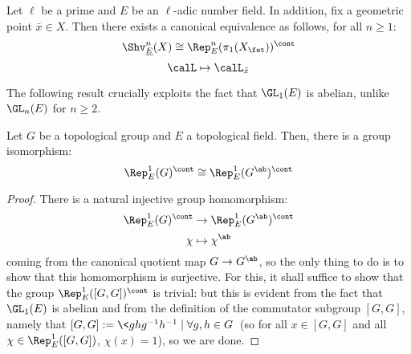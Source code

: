         \begin{corollary} \label{coro: representations_of_the_etale_fundamental_group}
            Let $\ell$ be a prime and $E$ be an $\ell$-adic number field. In addition, fix a geometric point $\bar{x} \in X$. Then there exists a canonical equivalence as follows, for all $n \geq 1$:
                $$\Shv^n_{\underline{E}}(X) \cong \Rep_E^n(\pi_1(X_{\fet}))^{\cont}$$
                $$\calL \mapsto \calL_{\bar{x}}$$
        \end{corollary}
            
        The following result crucially exploits the fact that $\GL_1(E)$ is abelian, unlike $\GL_n(E)$ for $n \geq 2$.
        \begin{lemma} \label{lemma: abelianising_continuous_characters}
            Let $G$ be a topological group and $E$ a topological field. Then, there is a group isomorphism:
                $$\Rep^1_E(G)^{\cont} \cong \Rep^1_E(G^{\ab})^{\cont}$$
        \end{lemma}
            \begin{proof}
                There is a natural injective group homomorphism:
                    $$\Rep^1_E(G)^{\cont} \to \Rep^1_E(G^{\ab})^{\cont}$$
                    $$\chi \mapsto \chi^{\ab}$$
                coming from the canonical quotient map $G \to G^{\ab}$, so the only thing to do is to show that this homomorphism is surjective. For this, it shall suffice to show that the group $\Rep^1_E([G, G])^{\cont}$ is trivial: but this is evident from the fact that $\GL_1(E)$ is abelian and from the definition of the commutator subgroup $[G, G]$, namely that $[G, G] := \<ghg^{-1}h^{-1} \mid \forall g, h \in G\>$ (so for all $x \in [G, G]$ and all $\chi \in \Rep^1_E([G, G])$, $\chi(x) = 1$), so we are done.
            \end{proof}
            
